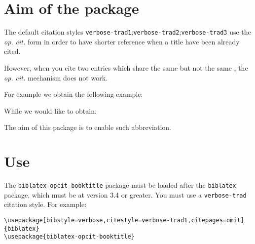 \documentclass{ltxdockit}[2011/03/25]
\begin{document}
\printtitlepage
\tableofcontents


\section{Aim of the package}

The default citation styles \verb+verbose-trad1+;\verb+verbose-trad2+;\verb+verbose-trad3+ use the \emph{op. cit.} form in order to have shorter reference when a title have been already cited.

However, when you cite two  entries which share the same  but not the same , the \emph{op. cit.} mechanism does not work.

For example we obtain the following example:

\begin{quotation}
\makeatletter
\cite{Pleiade_Barnabe}


\cite{Pseudo-Hippolyte}


\cite{Pleiade_Tite}


\cite{Pseudo-Epiphane}
\makeatother
\end{quotation}

While we would like to obtain:

\citereset


\begin{quotation}

\cite{Pleiade_Barnabe}

\cite{Pseudo-Hippolyte}

\cite{Pleiade_Tite}

\cite{Pseudo-Epiphane}
\end{quotation}

The aim of this package is to enable such abbreviation.

\section{Use}

The \verb+biblatex-opcit-booktitle+ package must be loaded after the \verb+biblatex+ package, which must be at version 3.4 or greater. You must use a \verb+verbose-trad+ citation style. For example:

\begin{verbatim}
\usepackage[bibstyle=verbose,citestyle=verbose-trad1,citepages=omit]{biblatex}
\usepackage{biblatex-opcit-booktitle}
\end{verbatim}
\end{document}
